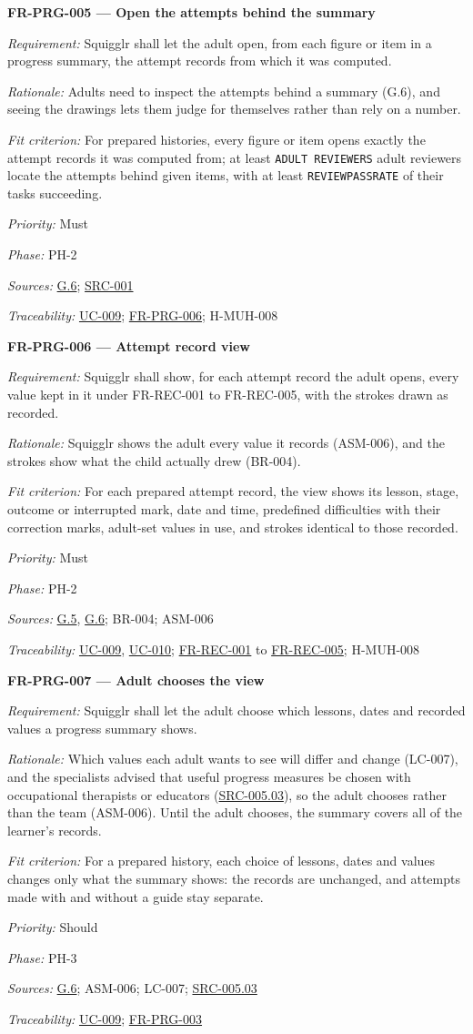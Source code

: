 \documentclass[12pt]{article}
\renewcommand{\_}{\textunderscore\allowbreak}%
\newcommand{\goalref}[1]{\hyperref[goal:#1]{G.#1}}
\newcommand{\ucref}[1]{\hyperref[uc:#1]{\mbox{UC-#1}}}
\newenvironment{srsrequirement}[2]{%
  \par\medskip\noindent\phantomsection\label{req:#1}%
  \textbf{#1 --- #2}\par\nobreak\smallskip }{\par\medskip}
\newcommand{\reqfield}[2]{\noindent\textit{#1:} #2\par}
\newcommand{\reqshall}[1]{\reqfield{Requirement}{#1}}
\newcommand{\reqrationale}[1]{\reqfield{Rationale}{#1}}
\newcommand{\reqfit}[1]{\reqfield{Fit criterion}{#1}}
\newcommand{\reqpriority}[1]{\reqfield{Priority}{#1}}
\newcommand{\reqphase}[1]{\reqfield{Phase}{#1}}
\newcommand{\reqsources}[1]{\reqfield{Sources}{#1}}
\newcommand{\reqtraces}[1]{\reqfield{Traceability}{#1}}
\newcommand{\reqref}[1]{\hyperref[req:#1]{#1}}
\newcommand{\srcref}[1]{\hyperref[src:#1]{SRC-#1}}
\providecommand{\ucref}[1]{\hyperref[uc:#1]{UC-#1}}
\begin{document}
\begin{srsrequirement}{FR-PRG-005}{Open the attempts behind the summary}
  \reqshall{Squigglr shall let the adult open, from each figure or item in a
progress summary, the attempt records from which it was computed.}
\reqrationale{Adults need to inspect the attempts behind a summary (G.6), and
seeing the drawings lets them judge for themselves rather than rely on a
number.} \reqfit{For prepared histories, every figure or item opens exactly the
attempt records it was computed from; at least \texttt{ADULT\_\allowbreak
REVIEWERS} adult reviewers locate the attempts behind given items, with at least
\texttt{REVIEW\_\allowbreak PASS\_\allowbreak RATE} of their tasks succeeding.}
  \reqpriority{Must}
  \reqphase{PH-2}
  \reqsources{\goalref{6}; \srcref{001}} \reqtraces{\ucref{009};
  \reqref{FR-PRG-006}; H-MUH-008}
\end{srsrequirement}

\begin{srsrequirement}{FR-PRG-006}{Attempt record view}
  \reqshall{Squigglr shall show, for each attempt record the adult opens, every
value kept in it under FR-REC-001 to FR-REC-005, with the strokes drawn as
recorded.} \reqrationale{Squigglr shows the adult every value it records
(ASM-006), and the strokes show what the child actually drew (BR-004).}
\reqfit{For each prepared attempt record, the view shows its lesson, stage,
outcome or interrupted mark, date and time, predefined difficulties with their
correction marks, adult-set values in use, and strokes identical to those
recorded.}
  \reqpriority{Must}
  \reqphase{PH-2}
  \reqsources{\goalref{5}, \goalref{6}; BR-004; ASM-006} \reqtraces{\ucref{009},
  \ucref{010}; \reqref{FR-REC-001} to \reqref{FR-REC-005}; H-MUH-008}
\end{srsrequirement}

\begin{srsrequirement}{FR-PRG-007}{Adult chooses the view}
  \reqshall{Squigglr shall let the adult choose which lessons, dates and
recorded values a progress summary shows.} \reqrationale{Which values each adult
wants to see will differ and change (LC-007), and the specialists advised that
useful progress measures be chosen with occupational therapists or educators
(\hyperref[src:005.03]{SRC-005.03}), so the adult chooses rather than the team
(ASM-006). Until the adult chooses, the summary covers all of the learner's
records.} \reqfit{For a prepared history, each choice of lessons, dates and
values changes only what the summary shows: the records are unchanged, and
attempts made with and without a guide stay separate.}
  \reqpriority{Should}
  \reqphase{PH-3}
  \reqsources{\goalref{6}; ASM-006; LC-007; \hyperref[src:005.03]{SRC-005.03}}
  \reqtraces{\ucref{009}; \reqref{FR-PRG-003}}
\end{srsrequirement}
\end{document}
